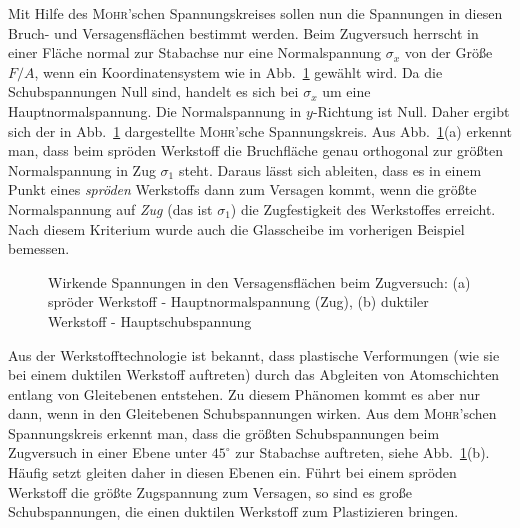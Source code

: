 Mit Hilfe des \textsc{Mohr}'schen Spannungskreises sollen nun die Spannungen in diesen Bruch- und Versagensflächen bestimmt werden.
Beim Zugversuch herrscht in einer Fläche normal zur Stabachse nur eine Normalspannung $\sigma_x$ von der Größe $F/A$, wenn ein Koordinatensystem wie in Abb.~\ref{fig:5-12} gewählt wird.
Da die Schubspannungen Null sind, handelt es sich bei $\sigma_x$ um eine Hauptnormalspannung.
Die Normalspannung in $y$-Richtung ist Null.
Daher ergibt sich der in Abb.~\ref{fig:5-12} dargestellte \textsc{Mohr}'sche Spannungskreis.
Aus Abb.~\ref{fig:5-12}(a) erkennt man, dass beim spröden Werkstoff die Bruchfläche genau orthogonal zur größten Normalspannung in Zug $\sigma_1$ steht.
Daraus lässt sich ableiten, dass es in einem Punkt eines \emph{spröden} Werkstoffs dann zum Versagen kommt, wenn die größte Normalspannung auf \emph{Zug} (das ist $\sigma_1$) die Zugfestigkeit des Werkstoffes erreicht.
Nach diesem Kriterium wurde auch die Glasscheibe im vorherigen Beispiel bemessen.
%
\begin{figure}[h!]
	\centering
	
	\caption{Wirkende Spannungen in den Versagensflächen beim Zugversuch: (a) spröder Werkstoff - Hauptnormalspannung (Zug), (b) duktiler Werkstoff - Hauptschubspannung}
	\label{fig:5-12}
\end{figure}
%

Aus der Werkstofftechnologie ist bekannt, dass plastische Verformungen (wie sie bei einem duktilen Werkstoff auftreten) durch das Abgleiten von Atomschichten entlang von Gleitebenen entstehen.
Zu diesem Phänomen kommt es aber nur dann, wenn in den Gleitebenen Schubspannungen wirken.
Aus dem \textsc{Mohr}'schen Spannungskreis erkennt man, dass die größten Schubspannungen beim Zugversuch in einer Ebene unter $45^\circ$ zur Stabachse auftreten, siehe Abb.~\ref{fig:5-12}(b).
Häufig setzt gleiten daher in diesen Ebenen ein.
Führt bei einem spröden Werkstoff die größte Zugspannung zum Versagen, so sind es große Schubspannungen, die einen duktilen Werkstoff zum Plastizieren bringen.

